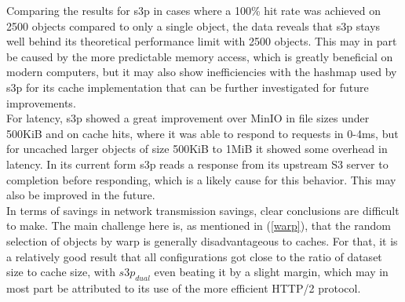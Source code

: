 Comparing the results for s3p in cases where a 100\% hit rate was achieved on 2500 objects compared to only a single object, the data reveals that s3p stays well behind its theoretical performance limit with 2500 objects. This may in part be caused by the more predictable memory access, which is greatly beneficial on modern computers, but it may also show inefficiencies with the hashmap used by s3p for its cache implementation that can be further investigated for future improvements.
\\
For latency, s3p showed a great improvement over MinIO in file sizes under 500KiB and on cache hits, where it was able to respond to requests in 0-4ms, but for uncached larger objects of size 500KiB to 1MiB it showed some overhead in latency. In its current form s3p reads a response from its upstream S3 server to completion before responding, which is a likely cause for this behavior. This may also be improved in the future.
\\
In terms of savings in network transmission savings, clear conclusions are difficult to make. The main challenge here is, as mentioned in (\ref{warp}), that the random selection of objects by warp is generally disadvantageous to caches. For that, it is a relatively good result that all configurations got close to the ratio of dataset size to cache size, with ${s3p}_{dual}$ even beating it by a slight margin, which may in most part be attributed to its use of the more efficient HTTP/2 protocol.